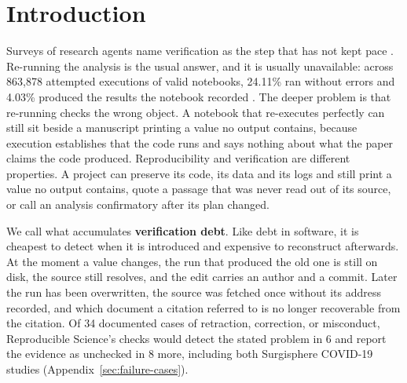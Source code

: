 \documentclass{article}
\begin{document}
\section{Introduction}
\label{sec:intro}

Surveys of research agents name verification as the step that has not kept pace
\citep{ding2026verificationgap}. Re-running the analysis is the usual answer, and it is
usually unavailable: across 863{,}878
attempted executions of valid notebooks, 24.11\% ran without errors and 4.03\% produced the
results the notebook recorded \citep{pimentel2019notebooks}. The deeper problem is that
re-running checks the wrong object. A notebook that re-executes perfectly can still sit beside a
manuscript printing a value no output contains, because execution establishes that the code runs
and says nothing about what the paper claims the code produced. Reproducibility and verification
are different properties. A project can preserve its code, its data and its logs and still
print a value no output contains, quote a passage that was never read out of its source, or call an analysis
confirmatory after its plan changed.

We call what accumulates \textbf{verification debt}. Like debt in software, it is cheapest to
detect when it is introduced and expensive to reconstruct afterwards. At the moment a value
changes, the run that produced the old one is still on disk, the source still resolves, and the
edit carries an author and a commit. Later the run has been overwritten, the source was fetched
once without its address recorded, and which document a citation referred to is no longer
recoverable from the citation. Of 34 documented cases of retraction, correction, or
misconduct, Reproducible Science's checks would detect the stated problem in 6 and report the
evidence as unchecked in 8 more, including both Surgisphere COVID-19 studies
(Appendix~\ref{sec:failure-cases}).
\end{document}
